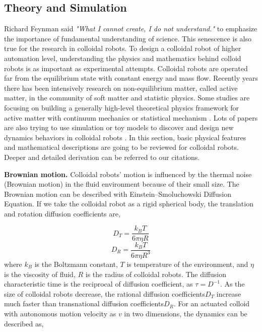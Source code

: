 \subsection{Theory and Simulation}
Richard Feynman said \textit{"What I cannot create, I do not understand."} to emphasize the importance of fundamental understanding of science. This senescence is also true for the  research in colloidal robots. To design a colloidal robot of higher automation level, understanding the physics and mathematics behind colloid robots is as  important as  experimental attempts. Colloidal robots are operated far from the equilibrium state with constant energy and mass flow. Recently years there has been intensively research on non-equilibrium matter, called active matter, in the community of soft matter and statistic physics. Some studies are focusing on building a generally high-level theoretical physics framework for active matter with continuum mechanics or statistical mechanism \autocite{stenhammar2013continuum,solon2015pressure,fodor2016far}. Lots of papers are also trying to use simulation or toy models to discover and design new dynamics behaviors in colloidal robots \autocite{bechinger2016active,speck2014effective,ten2011brownian}. In this section,  basic physical features and mathematical descriptions are going to be reviewed for colloidal robots.  Deeper and detailed derivation can be referred to our citations.

\textbf{Brownian motion.} Colloidal robots' motion is influenced by the thermal noise (Brownian motion) in the fluid environment because of their small size. The Brownian motion can be described with Einstein–Smoluchowski Diffusion Equation\autocite{islam2004einstein}. If we take the colloidal robot as  a rigid spherical body, the translation and rotation diffusion coefficients are,

\begin{equation}
    D_T=\frac{k_B T}{6 \pi \eta R }
\end{equation}
\begin{equation}
    D_R=\frac{k_B T}{6 \pi \eta R^3 }
\end{equation}
where $k_B$ is the Boltzmann constant, $T$ is temperature of the environment, and $\eta$ is the viscosity of fluid, $R$ is the radius of colloidal robots. The diffusion characteristic time is the 
reciprocal of diffusion coefficient, as  $\tau=D^{-1}$. As the size of colloidal robots decrease, the rational diffusion coefficients$D_T$ increase much faster than transnational diffusion coefficients$D_R$. For an actuated colloid with autonomous motion velocity as $v$ in two dimensions, the dynamics can be described as,

